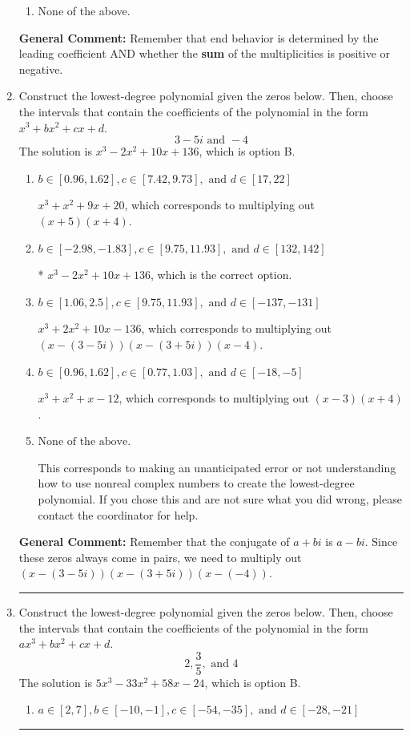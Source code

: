 \documentclass{extbook}[14pt]
\newcommand{\litem}[1]{\item #1

\rule{\textwidth}{0.4pt}}
\begin{document}
\begin{enumerate}
{\begin{enumerate}[label=\Alph*.]
\begin{multicols}{2}
\end{multicols}\item None of the above.\end{enumerate}
\textbf{General Comment:} Remember that end behavior is determined by the leading coefficient AND whether the \textbf{sum} of the multiplicities is positive or negative.
}
\litem{
Construct the lowest-degree polynomial given the zeros below. Then, choose the intervals that contain the coefficients of the polynomial in the form $x^3+bx^2+cx+d$.
\[ 3 - 5 i \text{ and } -4 \]The solution is \( x^{3} -2 x^{2} +10 x + 136 \), which is option B.\begin{enumerate}[label=\Alph*.]
\item \( b \in [0.96, 1.62], c \in [7.42, 9.73], \text{ and } d \in [17, 22] \)

$x^{3} + x^{2} +9 x + 20$, which corresponds to multiplying out $(x + 5)(x + 4)$.
\item \( b \in [-2.98, -1.83], c \in [9.75, 11.93], \text{ and } d \in [132, 142] \)

* $x^{3} -2 x^{2} +10 x + 136$, which is the correct option.
\item \( b \in [1.06, 2.5], c \in [9.75, 11.93], \text{ and } d \in [-137, -131] \)

$x^{3} +2 x^{2} +10 x -136$, which corresponds to multiplying out $(x-(3 - 5 i))(x-(3 + 5 i))(x -4)$.
\item \( b \in [0.96, 1.62], c \in [0.77, 1.03], \text{ and } d \in [-18, -5] \)

$x^{3} + x^{2} +x -12$, which corresponds to multiplying out $(x -3)(x + 4)$.
\item \( \text{None of the above.} \)

This corresponds to making an unanticipated error or not understanding how to use nonreal complex numbers to create the lowest-degree polynomial. If you chose this and are not sure what you did wrong, please contact the coordinator for help.
\end{enumerate}

\textbf{General Comment:} Remember that the conjugate of $a+bi$ is $a-bi$. Since these zeros always come in pairs, we need to multiply out $(x-(3 - 5 i))(x-(3 + 5 i))(x-(-4))$.
}
\litem{
Construct the lowest-degree polynomial given the zeros below. Then, choose the intervals that contain the coefficients of the polynomial in the form $ax^3+bx^2+cx+d$.
\[ 2, \frac{3}{5}, \text{ and } 4 \]The solution is \( 5x^{3} -33 x^{2} +58 x -24 \), which is option B.\begin{enumerate}[label=\Alph*.]
\item \( a \in [2, 7], b \in [-10, -1], c \in [-54, -35], \text{ and } d \in [-28, -21] \)


\end{enumerate}}
\end{enumerate}
\end{document}
